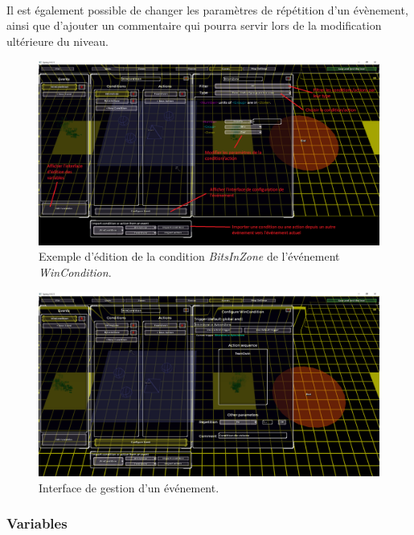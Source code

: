\documentclass[a4paper]{article}
\begin{document}
\paragraph{ }
Il est également possible de changer les paramètres de répétition d'un évènement, ainsi que d'ajouter un commentaire qui pourra servir lors de la modification ultérieure du niveau.
\begin{figure}[H]
\centering
\includegraphics[width=\linewidth]{editor-trigger.png}
\caption{Exemple d'édition de la condition \textit{BitsInZone} de l'événement \textit{WinCondition}.}
\label{fig:editor-trigger}
\end{figure}
\begin{figure}[H]
\centering
\includegraphics[width=\linewidth]{editor-eventconfig.png}
\caption{Interface de gestion d'un événement.}
\label{fig:editor-eventconfig}
\end{figure}
\subsubsection{Variables}
\end{document}
